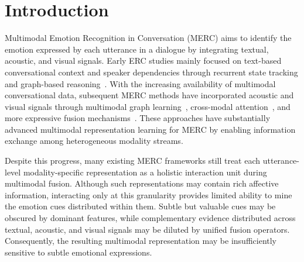 \documentclass[letterpaper]{article} %
\begin{document}
\section{Introduction}

Multimodal Emotion Recognition in Conversation (MERC) aims to identify the emotion expressed by each utterance in a dialogue by integrating textual, acoustic, and visual signals. Early ERC studies mainly focused on text-based conversational context and speaker dependencies through recurrent state tracking and graph-based reasoning~\cite{dialoguernn,dialoguegcn}. With the increasing availability of multimodal conversational data, subsequent MERC methods have incorporated acoustic and visual signals through multimodal graph learning~\cite{mmgcn}, cross-modal attention~\cite{dialoguetrm}, and more expressive fusion mechanisms~\cite{sdt,css}. These approaches have substantially advanced multimodal representation learning for MERC by enabling information exchange among heterogeneous modality streams.

Despite this progress, many existing MERC frameworks still treat each utterance-level modality-specific representation as a holistic interaction unit during multimodal fusion. Although such representations may contain rich affective information, interacting only at this granularity provides limited ability to mine the emotion cues distributed within them. Subtle but valuable cues may be obscured by dominant features, while complementary evidence distributed across textual, acoustic, and visual signals may be diluted by unified fusion operators. Consequently, the resulting multimodal representation may be insufficiently sensitive to subtle emotional expressions.
\end{document}
